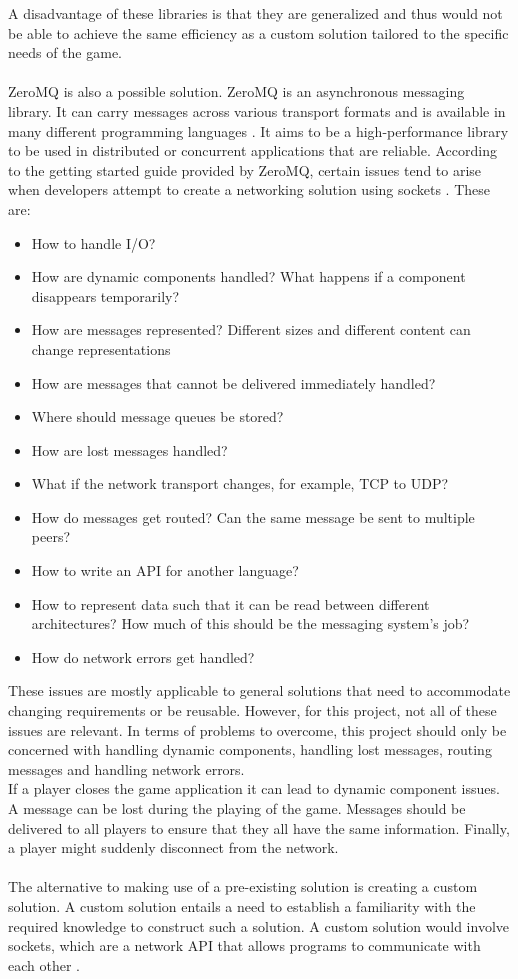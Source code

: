 A disadvantage of these libraries is that they are generalized and thus would not be able to achieve the same efficiency as a custom solution tailored to the specific needs of the game.
\\\\
ZeroMQ is also a possible solution.
ZeroMQ is an asynchronous messaging library.
It can carry messages across various transport formats and is available in many different programming languages \cite{zeromqdoc}.
It aims to be a high-performance library to be used in distributed or concurrent applications that are reliable.
According to the getting started guide provided by ZeroMQ, certain issues tend to arise when developers attempt to create a networking solution using sockets \cite{zeromqguide}.
These are:
\begin{itemize}
    \item How to handle I/O?
    \item How are dynamic components handled? What happens if a component disappears temporarily?
    \item How are messages represented? Different sizes and different content can change representations
    \item How are messages that cannot be delivered immediately handled?
    \item Where should message queues be stored?
    \item How are lost messages handled?
    \item What if the network transport changes, for example, TCP to UDP?
    \item How do messages get routed? Can the same message be sent to multiple peers?
    \item How to write an API for another language?
    \item How to represent data such that it can be read between different architectures? How much of this should be the messaging system's job?
    \item How do network errors get handled?
\end{itemize}
These issues are mostly applicable to general solutions that need to accommodate changing requirements or be reusable.
However, for this project, not all of these issues are relevant.
In terms of problems to overcome, this project should only be concerned with handling dynamic components, handling lost messages, routing messages and handling network errors.\\
If a player closes the game application it can lead to dynamic component issues.
A message can be lost during the playing of the game. 
Messages should be delivered to all players to ensure that they all have the same information.
Finally, a player might suddenly disconnect from the network. 
\\\\
The alternative to making use of a pre-existing solution is creating a custom solution.
A custom solution entails a need to establish a familiarity with the required knowledge to construct such a solution.
A custom solution would involve sockets, which are a network API  that allows programs to communicate with each other \cite{socketnetworking}.


